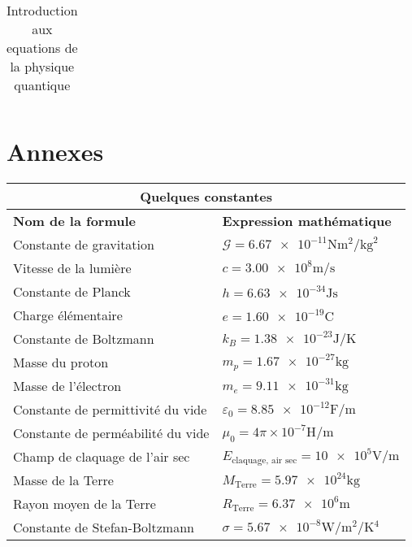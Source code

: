 \documentclass[10pt,a4paper,titlepage,portrait]{article}
\renewcommand{\arraystretch}{2}
\begin{document}
\begin{center}
\begin{table}[H]
\begin{tabular}{@{}p{9cm}p{10cm}@{}}
        \bottomrule
\end{tabular}
\caption{Introduction aux equations de la physique quantique}
\label{tab:quantphis}
\end{table}

\section{Annexes}

\begin{table}[H]
    \centering
    \renewcommand{\arraystretch}{1.5} %
    \setlength{\tabcolsep}{8pt} %
    \begin{tabular}{@{}p{9cm}p{10cm}@{}}
        \toprule
        \multicolumn{2}{c}{\textbf{Quelques constantes}} \\
        \midrule
        \textbf{Nom de la formule} & \textbf{Expression mathématique} \\
        \midrule
    Constante de gravitation & $\mathcal{G} = \num{6,67e-11} \unit{\newton\meter\squared\per\kilogram\squared}$ \\ 
    Vitesse de la lumière & $c = \num{3,00e8} \unit{\meter\per\second}$ \\ 
    Constante de Planck & $h = \num{6,63e-34} \unit{\joule\second}$ \\ 
    Charge élémentaire & $e = \num{1,60e-19} \unit{\coulomb}$ \\ 
    Constante de Boltzmann & $k_B = \num{1,38e-23} \unit{\joule\per\kelvin}$ \\ 
    Masse du proton & $m_p = \num{1,67e-27} \unit{\kilogram}$ \\ 
    Masse de l'électron & $m_e = \num{9,11e-31} \unit{\kilogram}$ \\ 
    Constante de permittivité du vide & $\varepsilon_0 = \num{8,85e-12} \unit{\farad\per\meter}$ \\ 
    Constante de perméabilité du vide & $\mu_0 = {4\pi\times 10^{-7}} \unit{\henry\per\meter}$ \\ 
    Champ de claquage de l'air sec &$ E_{\text{claquage, air sec}} = \num{10e5} \unit{\volt\per\meter}$ \\
    Masse de la Terre & $M_\text{Terre} = \num{5,97e24} \unit{\kilogram}$ \\ 
    Rayon moyen de la Terre & $R_\text{Terre} = \num{6,37e6} \unit{\meter}$ \\ 
    Constante de Stefan-Boltzmann & $\sigma = \num{5,67e-8} \unit{\watt\per\meter\squared\per\kelvin^4}$ \\ 

\end{tabular}
\end{table}
\end{center}
\end{document}
